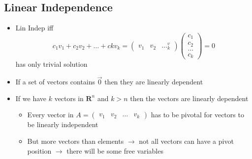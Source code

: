 \documentclass{article}
\begin{document}
\subsection{Linear Independence}
\begin{itemize}
    \item Lin Indep iff \[c_1v_1+c_2v_2+\dots+ckv_k=\begin{pmatrix} v_1&v_2&\dots^v_k \end{pmatrix}\begin{pmatrix} c_1\\c_2\\\dots\\c_k \end{pmatrix}=0\] 
    has only trivial solution
    \item If a set of vectors contains \(\vec{0}\) then they are linearly dependent
    \item If we have \(k\) vectors in \(\textbf{R}^n\) and \(k>n\) then the vectors are linearly dependent
    \begin{itemize}
        \item Every vector in \(A=\begin{pmatrix} v_1&v_2&\dots&v_k \end{pmatrix}\) has to be pivotal for vectors to be linearly independent
        \item But more vectors than elements \(\rightarrow\) not all vectors can have a pivot position \(\rightarrow\) there will be some free variables 
    \end{itemize}
\end{itemize}
\end{document}
